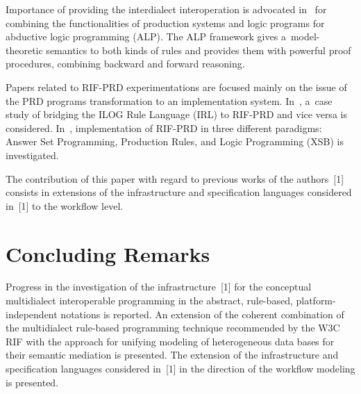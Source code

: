 \begin{multicols}{2}
  Importance of providing the interdialect interoperation is advocated
  in~\cite{18-kal} for combining the functionalities of production systems and logic
programs for abductive logic programming (ALP). The ALP framework gives a~model-theoretic semantics to both kinds of rules and provides them with powerful
proof procedures, combining backward and forward reasoning.

  Papers related to RIF-PRD experimentations are focused mainly on the issue of the
PRD programs transformation to an implementation system. In~\cite{19-kal}, a~case
study of bridging the ILOG Rule Language (IRL) to RIF-PRD and vice versa is
considered. In~\cite{20-kal}, implementation of RIF-PRD in three different
paradigms: Answer Set Programming, Production Rules, and Logic Programming
(XSB) is investigated.

  The contribution of this paper with regard to previous works of the authors~[1] consists in
extensions of the infrastructure and specification languages considered in~[1] to the
workflow level.

\section{Concluding Remarks}

  \noindent
  Progress in the investigation of the infrastructure~[1] for the conceptual
multidialect interoperable programming in the abstract, rule-based,
platform-independent notations is reported. An extension of the coherent
combination of the multidialect rule-based programming technique recommended by
the W3C RIF with the approach for unifying modeling of heterogeneous data bases
for their semantic mediation is presented. The extension of the infrastructure and specification
languages considered in~[1] in the direction of the workflow modeling is presented.


\end{multicols}
